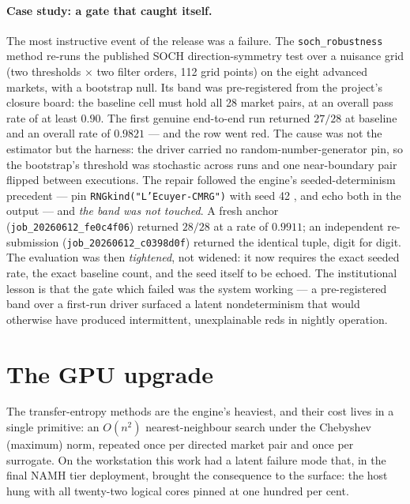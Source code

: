 \documentclass[11pt]{article}
\newcommand{\code}[1]{\texttt{\small #1}}
\begin{document}
\paragraph{Case study: a gate that caught itself.} The most instructive event of
the release was a failure. The \code{soch\_robustness} method re-runs the
published SOCH direction-symmetry test over a nuisance grid (two thresholds
$\times$ two filter orders, 112 grid points) on the eight advanced markets, with
a bootstrap null. Its band was pre-registered from the project's closure
board: the baseline cell must hold all 28 market pairs, at an overall pass rate
of at least $0.90$. The first genuine end-to-end run returned $27/28$ at baseline
and an overall rate of $0.9821$ --- and the row went red. The cause was not the
estimator but the harness: the driver carried no random-number-generator pin, so
the bootstrap's threshold was stochastic across runs and one near-boundary pair
flipped between executions. The repair followed the engine's seeded-determinism
precedent --- pin \code{RNGkind("L'Ecuyer-CMRG")} with seed 42
\cite{lecuyer1999}, and echo both in the output --- and \emph{the band was not
touched}. A fresh anchor (\code{job\_20260612\_fe0c4f06}) returned $28/28$ at a
rate of $0.9911$; an independent re-submission (\code{job\_20260612\_c0398d0f})
returned the identical tuple, digit for digit. The evaluation was then
\emph{tightened}, not widened: it now requires the exact seeded rate, the exact
baseline count, and the seed itself to be echoed. The institutional lesson is
that the gate which failed was the system working --- a pre-registered band over
a first-run driver surfaced a latent nondeterminism that would otherwise have
produced intermittent, unexplainable reds in nightly operation.

\section{The GPU upgrade}
\label{sec:gpu}
The transfer-entropy methods are the engine's heaviest, and their cost lives in
a single primitive: an $O(n^2)$ nearest-neighbour search under the Chebyshev
(maximum) norm, repeated once per directed market pair and once per surrogate.
On the workstation this work had a latent failure mode that, in the final NAMH
tier deployment, brought the consequence to the surface: the host hung with all
twenty-two logical cores pinned at one hundred per cent.
\end{document}
